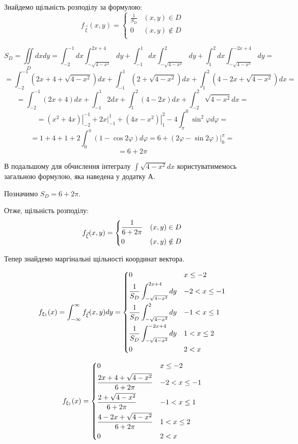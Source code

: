 \documentclass[14pt, a4paper, ukrainian]{extreport}
\begin{document}
	Знайдемо щільність розподілу за формулою:
	$$f_{\vec \xi}(x, y) = 
	\begin{cases}
		\frac{1}{S_D} & (x, y) \in D\\
		0 & (x, y) \notin D\\
	\end{cases}
	$$
	
	$$S_D = \iint\limits_D dxdy = \int_{-2}^{-1}dx\int_{-\sqrt{4-x^2}}^{2x+4}dy + \int_{-1}^{1}dx\int_{-\sqrt{4-x^2}}^{2}dy + \int_{1}^{2}dx\int_{-\sqrt{4-x^2}}^{-2x+4}dy =$$
	$$ = \int_{-2}^{-1}(2x+4 + \sqrt{4-x^2})dx + \int_{-1}^{1}(2 + \sqrt{4-x^2})dx + \int_{1}^{2}(4- 2x+\sqrt{4-x^2})dx =$$
	$$ = \int_{-2}^{-1}(2x+4)dx + \int_{-1}^{1}2dx + \int_{1}^{2}(4- 2x)dx + \int_{-2}^{2}\sqrt{4-x^2}dx=$$
	$$ = \left.\left(x^2 + 4x\right)\right|_{-2}^{-1} + \left.2x\right|_{-1}^{1} + \left.\left(4x - x^2\right)\right|_{1}^{2} - 4\int_{\pi}^{0}\sin^2{\varphi}d\varphi = $$
	$$ = 1 + 4 + 1 + 2\int_{0}^{\pi}(1 -\cos{2\varphi})d\varphi = 6 + \left.(2\varphi - \sin{2\varphi})\right|_{0}^{\pi} = $$
	$$ = 6 + 2\pi
	$$
	
	В подальшому для обчислення інтегралу $\int\sqrt{4-x^2}dx$ користуватимемось загальною формулою, яка наведена у додатку А.
	
	Позначимо $S_D = 6 + 2\pi$.
	
	Отже, щільність розподілу:
	$$f_{\vec \xi}(x, y) = 
	\begin{dcases}
		\frac{1}{6+2\pi} & (x, y) \in D\\
		0 & (x, y) \notin D\\
	\end{dcases}
	$$
	
	Тепер знайдемо маргінальні щільності координат вектора.
		
	$$f_{\xi_1}(x) = \int_{-\infty}^{\infty}f_{\vec\xi}(x, y)dy =
	\begin{dcases}
		0 & x \le -2\\
		\frac{1}{S_D}\int_{-\sqrt{4-x^2}}^{2x+4}dy & -2 < x \le -1\\
		 \frac{1}{S_D}\int_{-\sqrt{4-x^2}}^{2}dy & -1 < x \le 1\\
		 \frac{1}{S_D}\int_{-\sqrt{4-x^2}}^{-2x+4}dy & 1 < x \le 2\\
		 0 & 2 < x
	\end{dcases}
	$$	
	
	$$f_{\xi_1}(x) = 
	\begin{dcases}
		0 & x \le -2\\
		\frac{2x+4+\sqrt{4-x^2}}{6+2\pi} & -2 < x \le -1\\
		\frac{2+\sqrt{4-x^2}}{6+2\pi} & -1 < x \le 1\\
		\frac{4-2x+\sqrt{4-x^2}}{6+2\pi} & 1 < x \le 2\\
		0 & 2 < x
	\end{dcases}
	$$	
	
\end{document}
